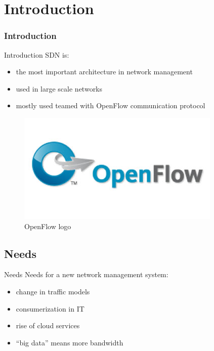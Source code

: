 
\section{Introduction}
\frame
{
\frametitle{Introduction}
\tableofcontents[currentsection]
\addtocounter{framenumber}{-1}
}

\begin{frame}{Introduction}
SDN is:
\begin{itemize}
\item<2-> the most important architecture in network management
\item<3-> used in large scale networks
\item<4-> mostly used teamed with OpenFlow communication protocol
\end{itemize}
\begin{figure}
\includegraphics[scale=0.25]{Immagini/OpenFlow.jpg}
\caption{OpenFlow logo}
\label{fig:OpenFlow-logo}
\end{figure}
\end{frame}

\subsection{Needs}
\begin{frame}{Needs}
Needs for a new network management system:
\begin{itemize}
\item<2-> change in traffic models
\item<3-> consumerization in IT
\item<4-> rise of cloud services
\item<5-> ``big data'' means more bandwidth
\end{itemize}
\end{frame}

